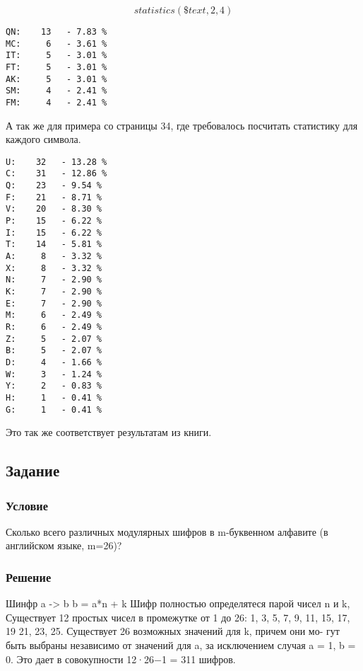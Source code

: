 \documentclass[10pt,a4paper]{article}
\begin{document}
$$ statistics(\$text, 2, 4) $$ 
\begin{lstlisting}
QN:    13   - 7.83 %
MC:     6   - 3.61 %
IT:     5   - 3.01 %
FT:     5   - 3.01 %
AK:     5   - 3.01 %
SM:     4   - 2.41 %
FM:     4   - 2.41 %
\end{lstlisting}
А так же для примера со страницы 34, где требовалось посчитать
статистику для каждого символа.
\begin{lstlisting}
U:    32   - 13.28 %
C:    31   - 12.86 %
Q:    23   - 9.54 %
F:    21   - 8.71 %
V:    20   - 8.30 %
P:    15   - 6.22 %
I:    15   - 6.22 %
T:    14   - 5.81 %
A:     8   - 3.32 %
X:     8   - 3.32 %
N:     7   - 2.90 %
K:     7   - 2.90 %
E:     7   - 2.90 %
M:     6   - 2.49 %
R:     6   - 2.49 %
Z:     5   - 2.07 %
B:     5   - 2.07 %
D:     4   - 1.66 %
W:     3   - 1.24 %
Y:     2   - 0.83 %
H:     1   - 0.41 %
G:     1   - 0.41 %
\end{lstlisting}
Это так же соответствует результатам из книги.


\subsection*{Задание}
\subsubsection*{Условие}
Сколько всего различных модулярных шифров в m-буквенном алфавите (в английском языке, m=26)? 
\subsubsection*{Решение}
Шинфр a -> b
b = a*n + k
Шифр полностью определятеся парой чисел n и k, 
Существует 12 простых чисел в промежутке от 1 до 26: 1, 3, 5, 7, 9, 11, 15, 17, 19
21, 23, 25. Существует 26 возможных значений для k, причем они мо-
гут быть выбраны независимо от значений для a, за исключением
случая a = 1, b = 0. Это дает в совокупности 12·26−1 = 311 шифров.
\end{document}

